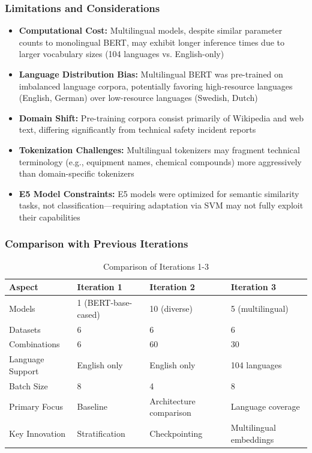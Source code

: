 \documentclass[11pt, titlepage, bibliography=totoc]{scrreprt}
\begin{document}
\subsubsection{Limitations and Considerations}

\begin{itemize}
    \item \textbf{Computational Cost:} Multilingual models, despite similar parameter counts to monolingual BERT, may exhibit longer inference times due to larger vocabulary sizes (104 languages vs. English-only)
    \item \textbf{Language Distribution Bias:} Multilingual BERT was pre-trained on imbalanced language corpora, potentially favoring high-resource languages (English, German) over low-resource languages (Swedish, Dutch)
    \item \textbf{Domain Shift:} Pre-training corpora consist primarily of Wikipedia and web text, differing significantly from technical safety incident reports
    \item \textbf{Tokenization Challenges:} Multilingual tokenizers may fragment technical terminology (e.g., equipment names, chemical compounds) more aggressively than domain-specific tokenizers
    \item \textbf{E5 Model Constraints:} E5 models were optimized for semantic similarity tasks, not classification—requiring adaptation via SVM may not fully exploit their capabilities
\end{itemize}

\subsubsection{Comparison with Previous Iterations}

\begin{table}[htbp]
\centering
\small
\begin{tabular}{@{}llll@{}}
\toprule
\textbf{Aspect} & \textbf{Iteration 1} & \textbf{Iteration 2} & \textbf{Iteration 3} \\
\midrule
Models & 1 (BERT-base-cased) & 10 (diverse) & 5 (multilingual) \\
Datasets & 6 & 6 & 6 \\
Combinations & 6 & 60 & 30 \\
Language Support & English only & English only & 104 languages \\
Batch Size & 8 & 4 & 8 \\
Primary Focus & Baseline & Architecture comparison & Language coverage \\
Key Innovation & Stratification & Checkpointing & Multilingual embeddings \\
\bottomrule
\end{tabular}
\caption{Comparison of Iterations 1-3}
\label{tab:iteration_comparison}
\end{table}
\end{document}
